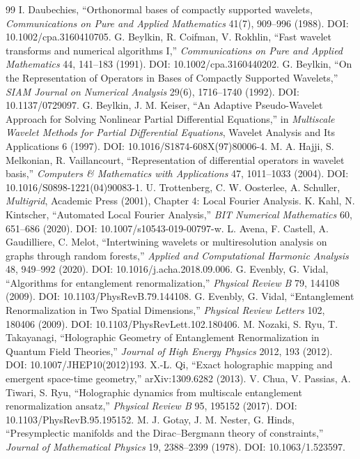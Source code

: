 \documentclass[11pt,a4paper]{article}
\begin{document}
\begin{thebibliography}{99}
 I. Daubechies, ``Orthonormal bases of compactly supported wavelets, \textit{Communications on Pure and Applied Mathematics} 41(7), 909--996 (1988). DOI: 10.1002/cpa.3160410705.
 G. Beylkin, R. Coifman, V. Rokhlin, ``Fast wavelet transforms and numerical algorithms I,'' \textit{Communications on Pure and Applied Mathematics} 44, 141--183 (1991). DOI: 10.1002/cpa.3160440202.
 G. Beylkin, ``On the Representation of Operators in Bases of Compactly Supported Wavelets,'' \textit{SIAM Journal on Numerical Analysis} 29(6), 1716--1740 (1992). DOI: 10.1137/0729097.
 G. Beylkin, J. M. Keiser, ``An Adaptive Pseudo-Wavelet Approach for Solving Nonlinear Partial Differential Equations,'' in \textit{Multiscale Wavelet Methods for Partial Differential Equations}, Wavelet Analysis and Its Applications 6 (1997). DOI: 10.1016/S1874-608X(97)80006-4.
 M. A. Hajji, S. Melkonian, R. Vaillancourt, ``Representation of differential operators in wavelet basis,'' \textit{Computers \& Mathematics with Applications} 47, 1011--1033 (2004). DOI: 10.1016/S0898-1221(04)90083-1.
 U. Trottenberg, C. W. Oosterlee, A. Schuller, \textit{Multigrid}, Academic Press (2001), Chapter 4: Local Fourier Analysis.
 K. Kahl, N. Kintscher, ``Automated Local Fourier Analysis,'' \textit{BIT Numerical Mathematics} 60, 651--686 (2020). DOI: 10.1007/s10543-019-00797-w.
 L. Avena, F. Castell, A. Gaudilliere, C. Melot, ``Intertwining wavelets or multiresolution analysis on graphs through random forests,'' \textit{Applied and Computational Harmonic Analysis} 48, 949--992 (2020). DOI: 10.1016/j.acha.2018.09.006.
 G. Evenbly, G. Vidal, ``Algorithms for entanglement renormalization,'' \textit{Physical Review B} 79, 144108 (2009). DOI: 10.1103/PhysRevB.79.144108.
 G. Evenbly, G. Vidal, ``Entanglement Renormalization in Two Spatial Dimensions,'' \textit{Physical Review Letters} 102, 180406 (2009). DOI: 10.1103/PhysRevLett.102.180406.
 M. Nozaki, S. Ryu, T. Takayanagi, ``Holographic Geometry of Entanglement Renormalization in Quantum Field Theories,'' \textit{Journal of High Energy Physics} 2012, 193 (2012). DOI: 10.1007/JHEP10(2012)193.
 X.-L. Qi, ``Exact holographic mapping and emergent space-time geometry,'' arXiv:1309.6282 (2013).
 V. Chua, V. Passias, A. Tiwari, S. Ryu, ``Holographic dynamics from multiscale entanglement renormalization ansatz,'' \textit{Physical Review B} 95, 195152 (2017). DOI: 10.1103/PhysRevB.95.195152.
 M. J. Gotay, J. M. Nester, G. Hinds, ``Presymplectic manifolds and the Dirac--Bergmann theory of constraints,'' \textit{Journal of Mathematical Physics} 19, 2388--2399 (1978). DOI: 10.1063/1.523597.
\end{thebibliography}
\end{document}
